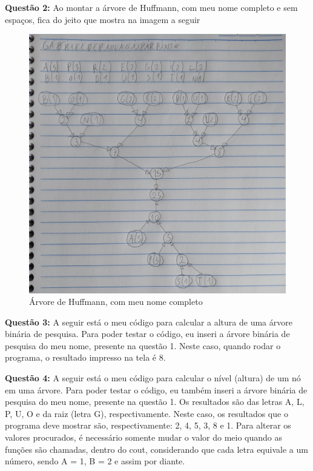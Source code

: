 \documentclass{article}
\begin{document}
\newpage
\textbf{Questão 2:}
Ao montar a árvore de Huffmann, com meu nome completo e sem espaços, fica do jeito que mostra na imagem a seguir

\begin{figure}[h!]
    \centering
    \includegraphics[width=0.5\linewidth]{huffmann.jpg}
    \caption{Árvore de Huffmann, com meu nome completo}
    \label{fig:questao1}
\end{figure}

\textbf{Questão 3:}
A seguir está o meu código para calcular a altura de uma árvore binária de pesquisa. Para poder testar o código, eu inseri a árvore binária de pesquisa do meu nome, presente na questão 1. Neste caso, quando rodar o programa, o resultado impresso na tela é 8.



\newpage
\textbf{Questão 4:}
A seguir está o meu código para calcular o nível (altura) de um nó em uma árvore. Para poder testar o código, eu também inseri a árvore binária de pesquisa do meu nome, presente na questão 1. Os resultados são das letras A, L, P, U, O e da raiz (letra G), respectivamente. Neste caso, os resultados que o programa deve mostrar são, respectivamente: 2, 4, 5, 3, 8 e 1. Para alterar os valores procurados, é necessário somente mudar o valor do meio quando as funções são chamadas, dentro do cout, considerando que cada letra equivale a um número, sendo A = 1, B = 2 e assim por diante.


\end{document}
